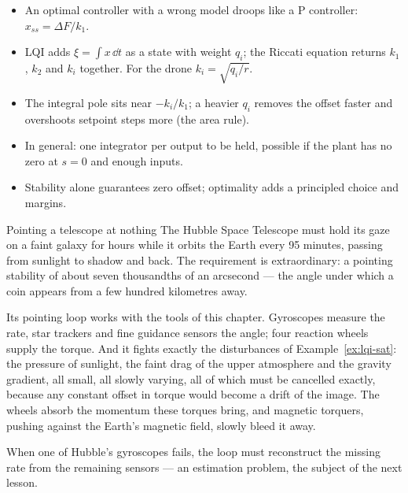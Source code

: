 \begin{remember}
\begin{itemize}
  \item An optimal controller with a wrong model droops like a P controller: $x_{ss} = \Delta F/k_1$.
  \item LQI adds $\xi = \int x\,\dd t$ as a state with weight $q_i$; the Riccati equation returns $k_1$, $k_2$ and $k_i$ together. For the drone $k_i = \sqrt{q_i/r}$.
  \item The integral pole sits near $-k_i/k_1$; a heavier $q_i$ removes the offset faster and overshoots setpoint steps more (the area rule).
  \item In general: one integrator per output to be held, possible if the plant has no zero at $s = 0$ and enough inputs.
  \item Stability alone guarantees zero offset; optimality adds a principled choice and margins.
\end{itemize}
\end{remember}

\begin{curiosity}{Pointing a telescope at nothing}
The Hubble Space Telescope must hold its gaze on a faint galaxy for hours while it orbits the Earth every 95 minutes, passing from sunlight to shadow and back. The requirement is extraordinary: a pointing stability of about seven thousandths of an arcsecond — the angle under which a coin appears from a few hundred kilometres away.

Its pointing loop works with the tools of this chapter. Gyroscopes measure the rate, star trackers and fine guidance sensors the angle; four reaction wheels supply the torque. And it fights exactly the disturbances of Example~\ref{ex:lqi-sat}: the pressure of sunlight, the faint drag of the upper atmosphere and the gravity gradient, all small, all slowly varying, all of which must be cancelled exactly, because any constant offset in torque would become a drift of the image. The wheels absorb the momentum these torques bring, and magnetic torquers, pushing against the Earth's magnetic field, slowly bleed it away.

When one of Hubble's gyroscopes fails, the loop must reconstruct the missing rate from the remaining sensors — an estimation problem, the subject of the next lesson.
\end{curiosity}

